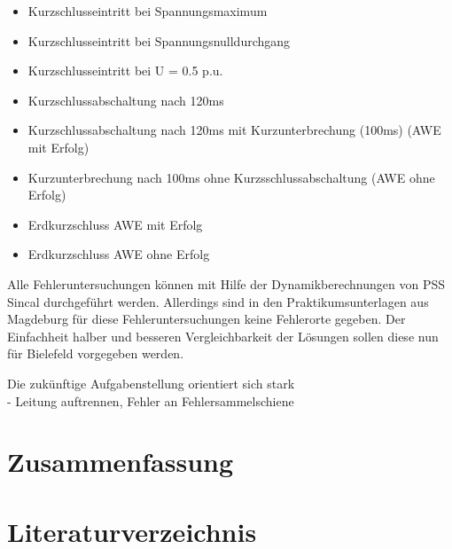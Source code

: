 \documentclass{scrartcl}
\begin{document}
\begin{onehalfspace}
\begin{itemize}
\item Kurzschlusseintritt bei Spannungsmaximum
\item Kurzschlusseintritt bei Spannungsnulldurchgang
\item Kurzschlusseintritt bei U = 0.5 p.u.
\item Kurzschlussabschaltung nach 120ms
\item Kurzschlussabschaltung nach 120ms mit Kurzunterbrechung (100ms) (AWE mit Erfolg)
\item Kurzunterbrechung nach 100ms ohne Kurzsschlussabschaltung (AWE ohne Erfolg)
\item Erdkurzschluss AWE mit Erfolg
\item Erdkurzschluss AWE ohne Erfolg
\end{itemize}

Alle Fehleruntersuchungen können mit Hilfe der Dynamikberechnungen von PSS Sincal durchgeführt werden. Allerdings sind in den Praktikumsunterlagen aus Magdeburg für diese Fehleruntersuchungen keine Fehlerorte gegeben. Der Einfachheit halber und besseren Vergleichbarkeit der Lösungen sollen diese nun für Bielefeld vorgegeben werden.

Die zukünftige Aufgabenstellung orientiert sich stark \\
- Leitung auftrennen, Fehler an \glqq Fehlersammelschiene\grqq


\section{Zusammenfassung}

\newpage
{}
\setcounter{page}{1}
\section{Literaturverzeichnis}





\end{onehalfspace}
\end{document}
